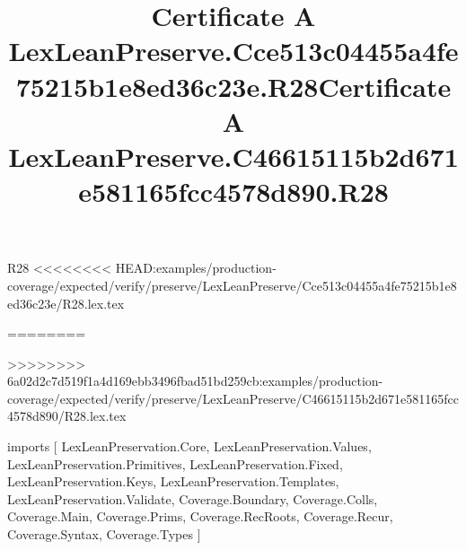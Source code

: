 \begin{lexlean}{R28}
<<<<<<<< HEAD:examples/production-coverage/expected/verify/preserve/LexLeanPreserve/Cce513c04455a4fe75215b1e8ed36c23e/R28.lex.tex
\title{Certificate A LexLeanPreserve.Cce513c04455a4fe75215b1e8ed36c23e.R28}
========
\title{Certificate A LexLeanPreserve.C46615115b2d671e581165fcc4578d890.R28}
>>>>>>>> 6a02d2c7d519f1a4d169ebb3496fbad51bd259cb:examples/production-coverage/expected/verify/preserve/LexLeanPreserve/C46615115b2d671e581165fcc4578d890/R28.lex.tex
\begin{coremodule}
imports [
  LexLeanPreservation.Core,
  LexLeanPreservation.Values,
  LexLeanPreservation.Primitives,
  LexLeanPreservation.Fixed,
  LexLeanPreservation.Keys,
  LexLeanPreservation.Templates,
  LexLeanPreservation.Validate,
  Coverage.Boundary,
  Coverage.Colls,
  Coverage.Main,
  Coverage.Prims,
  Coverage.RecRoots,
  Coverage.Recur,
  Coverage.Syntax,
  Coverage.Types
]


\end{coremodule}
\end{lexlean}
